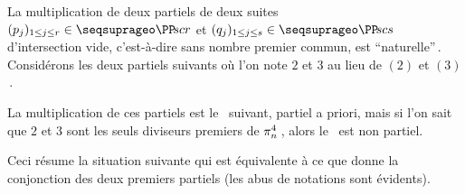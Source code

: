 \begin{example}
	La multiplication de deux \sftab[x] partiels de deux suites
	$( p_j )_{1 \leq j \leq r} \in \PPseq[r]$
	et
	$( q_j )_{1 \leq j \leq s} \in \PPseq[s]$
	d'intersection vide, c'est-à-dire sans nombre premier commun, est \enquote{naturelle}\,.
	Considérons les deux \sftab[x] partiels suivants où l'on note $2$ et $3$ au lieu de $(2)$ et $(3)$\,.

	\vspace{-1.5ex}
	\begin{multicols}{2}
	\begin{center}
	\end{center}

	\begin{center}
	\end{center}
	\end{multicols}


	\vspace{-1ex}
	La multiplication de ces \sftab[x] partiels est le \sftab\  suivant, partiel a priori, mais si l'on sait que $2$ et $3$ sont les seuls diviseurs premiers de $\consprod<4>$\,, alors le \sftab\ est non partiel.

	\begin{center}
	\end{center}

	Ceci résume la situation suivante qui est équivalente à ce que donne la conjonction des deux premiers \sftab[x] partiels (les abus de notations sont évidents).



\end{example}
